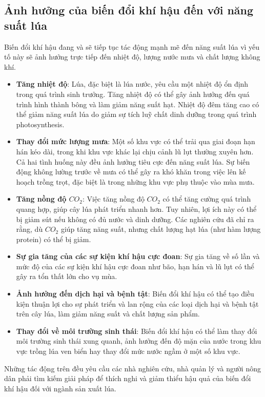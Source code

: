 \documentclass[12pt]{report}
\begin{document}
\subsection{Ảnh hưởng của biến đổi khí hậu đến với năng suất lúa} %
\label{sub:ảnh_hưởng_của_biến_đổi_khí_hậu_đến_với_năng_suất_lúa}
\begin{flushleft}
	Biến đổi khí hậu đang và sẽ tiếp tục tác động mạnh mẽ đến năng suất lúa vì yếu tố này sẽ ảnh hưởng trực tiếp đến nhiệt độ, lượng nước mưa và chất lượng không khí.

	\begin{itemize}
		\item \textbf{Tăng nhiệt độ}: Lúa, đặc biệt là lúa nước, yêu cầu một nhiệt độ ổn định trong quá trình sinh trưởng. Tăng nhiệt độ có thể gây ảnh hưởng đến quá trình hình thành bông và làm giảm năng suất hạt. Nhiệt độ đêm tăng cao có thể giảm năng suất lúa do giảm sự tích luỹ chất dinh dưỡng trong quá trình photosynthesis.

		\item \textbf{Thay đổi mức lượng mưa}: Một số khu vực có thể trải qua giai đoạn hạn hán kéo dài, trong khi khu vực khác lại chịu cảnh lũ lụt thường xuyên hơn. Cả hai tình huống này đều ảnh hưởng tiêu cực đến năng suất lúa. Sự biến động không lường trước về mưa có thể gây ra khó khăn trong việc lên kế hoạch trồng trọt, đặc biệt là trong những khu vực phụ thuộc vào mùa mưa.

		\item \textbf{Tăng nồng độ $CO_2$}: Việc tăng nồng độ $CO_2$ có thể tăng cường quá trình quang hợp, giúp cây lúa phát triển nhanh hơn. Tuy nhiên, lợi ích này có thể bị giảm sút nếu không có đủ nước và dinh dưỡng. Các nghiên cứu đã chỉ ra rằng, dù $CO_2$ giúp tăng năng suất, nhưng chất lượng hạt lúa (như hàm lượng protein) có thể bị giảm.

		\item \textbf{Sự gia tăng của các sự kiện khí hậu cực đoan}: Sự gia tăng về số lần và mức độ của các sự kiện khí hậu cực đoan như bão, hạn hán và lũ lụt có thể gây ra tổn thất lớn cho vụ mùa.

		\item \textbf{Ảnh hưởng đến dịch hại và bệnh tật}: Biến đổi khí hậu có thể tạo điều kiện thuận lợi cho sự phát triển và lan rộng của các loại dịch hại và bệnh tật trên cây lúa, làm giảm năng suất và chất lượng sản phẩm.

		\item \textbf{Thay đổi về môi trường sinh thái}: Biến đổi khí hậu có thể làm thay đổi môi trường sinh thái xung quanh, ảnh hưởng đến độ mặn của nước trong khu vực trồng lúa ven biển hay thay đổi mức nước ngầm ở một số khu vực.
	\end{itemize}

	Những tác động trên đều yêu cầu các nhà nghiên cứu, nhà quản lý và người nông dân phải tìm kiếm giải pháp để thích nghi và giảm thiểu hậu quả của biến đổi khí hậu đối với ngành sản xuất lúa.
\end{flushleft}
\end{document}
